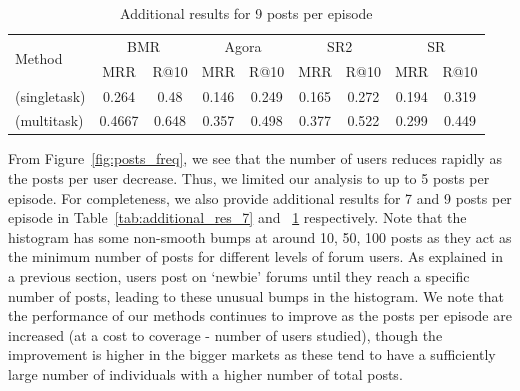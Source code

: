 \begin{table}[!htbp]
    \small
    \centering
		\begin{tabular}{lcccccccc}
 		\toprule
			\multirow{2}{*}{Method}	&\multicolumn{2}{c}{BMR}	&	\multicolumn{2}{c}{Agora}	&	\multicolumn{2}{c}{SR2}	&	\multicolumn{2}{c}{SR}\\
					&MRR&	R@10&	MRR&	R@10&	MRR&	R@10&	MRR&	R@10\\
		\midrule
			\SYSMLmethodname{}  (singletask) &	0.264 & 0.48	&	0.146	&	0.249	&	0.165   &	0.272	&	0.194	&	0.319	\\
				\hline
			\SYSMLmethodname{}  (multitask) &	0.4667	&	 0.648	&	0.357	&	0.498	&	0.377	&	0.522	&	0.299	&	0.449	\\
					\bottomrule
    	\end{tabular}
    	\caption{Additional results for 9 posts per episode}
      \label{tab:additional_res_9}
\end{table}

From Figure~\ref{fig:posts_freq}, we see that the number of users reduces rapidly as the posts per user decrease. Thus, we limited our analysis to up to 5 posts per episode.
For completeness, we also provide additional results for 7 and 9 posts per episode in Table~\ref{tab:additional_res_7} and ~\ref{tab:additional_res_9} respectively. Note that the histogram has some non-smooth bumps at around 10, 50, 100 posts as they act as the minimum number of posts for different levels of forum users. As explained in a previous section, users post on `newbie' forums until they reach a specific number of posts, leading to these unusual bumps in the histogram. 
We note that the performance of our methods continues to improve as the posts per episode are increased (at a cost to coverage - number of users studied), though the improvement is higher in the bigger markets as these tend to have a sufficiently large number of individuals with a higher number of total posts.
